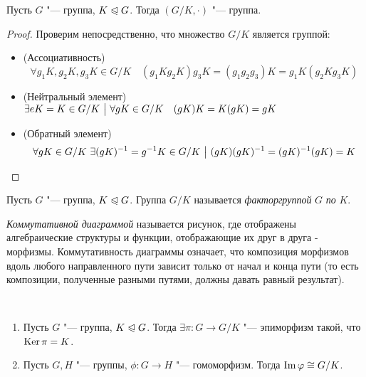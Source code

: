 \begin{proposition}
	Пусть $G$ "--- группа, $K \trianglelefteqslant G$. Тогда $(G / K, \cdot)$ "--- группа.
\end{proposition}

\begin{proof}
	Проверим непосредственно, что множество $G / K$ является группой:
	\begin{itemize}
		\item (Ассоциативность) \[
			\forall g_1K, g_2K, g_3K \in G / K \quad (g_1Kg_2K)g_3K = (g_1g_2g_3)K = g_1K(g_2Kg_3K)
		\]
		\item (Нейтральный элемент) \(
			\exists eK = K \in G / K \ \big|\  \forall gK \in G / K \quad (gK)K = K(gK) = gK
		\)
		\item (Обратный элемент) \[
			\forall gK \in G / K\ \exists (gK)^{-1} = g^{-1}K \in G / K \such (gK)(gK)^{-1} \hm= (gK)^{-1}(gK) = K
		\]
	\end{itemize}
\end{proof}

\begin{definition}
	Пусть $G$ "--- группа, $K \trianglelefteqslant G$. Группа $G / K$ называется \textit{факторгруппой} $G$ \textit{по} $K$.
\end{definition}

\begin{definition}
	\textit{Коммутативной диаграммой} называется рисунок, где отображены алгебраические структуры и функции, отображающие их друг в друга - морфизмы. Коммутативность диаграммы означает, что композиция морфизмов вдоль любого направленного пути зависит только от начал и конца пути (то есть композиции, полученные разными путями, должны давать равный результат).
\end{definition}

\begin{theorem}~
	\begin{enumerate}
		\item Пусть $G$ "--- группа, $K \trianglelefteqslant G$. Тогда $\exists \pi: G \to G / K$ "--- эпиморфизм такой, что $\ke\pi \hm= K$.
		\item Пусть $G, H$ "--- группы, $\phi: G \to H$ "--- гомоморфизм. Тогда $\operatorname{Im} \varphi \cong G / K$.
	\end{enumerate}
\end{theorem}

